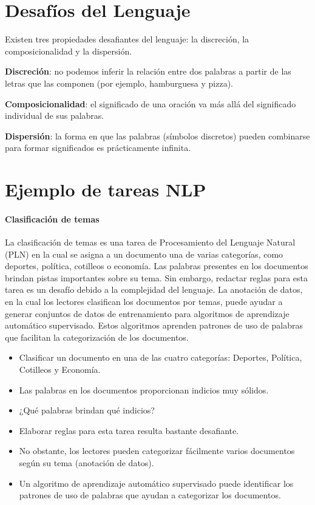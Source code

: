 \documentclass{book}
\begin{document}
\section{Desafíos del Lenguaje}

Existen tres propiedades desafiantes del lenguaje: la discreción, la composicionalidad y la dispersión.

\textbf{Discreción}: no podemos inferir la relación entre dos palabras a partir de las letras que las componen (por ejemplo, hamburguesa y pizza).

\textbf{Composicionalidad}: el significado de una oración va más allá del significado individual de sus palabras.

\textbf{Dispersión}: la forma en que las palabras (símbolos discretos) pueden combinarse para formar significados es prácticamente infinita.



\section{Ejemplo de tareas NLP}


\paragraph{Clasificación de temas}

La clasificación de temas es una tarea de Procesamiento del Lenguaje Natural (PLN) en la cual se asigna a un documento una de varias categorías, como deportes, política, cotilleos o economía. Las palabras presentes en los documentos brindan pistas importantes sobre su tema. Sin embargo, redactar reglas para esta tarea es un desafío debido a la complejidad del lenguaje. La anotación de datos, en la cual los lectores clasifican los documentos por temas, puede ayudar a generar conjuntos de datos de entrenamiento para algoritmos de aprendizaje automático supervisado. Estos algoritmos aprenden patrones de uso de palabras que facilitan la categorización de los documentos.

\begin{itemize}
\item Clasificar un documento en una de las cuatro categorías: Deportes, Política, Cotilleos y Economía.
\item Las palabras en los documentos proporcionan indicios muy sólidos.
\item ¿Qué palabras brindan qué indicios?
\item Elaborar reglas para esta tarea resulta bastante desafiante.
\item No obstante, los lectores pueden categorizar fácilmente varios documentos según su tema (anotación de datos).
\item Un algoritmo de aprendizaje automático supervisado puede identificar los patrones de uso de palabras que ayudan a categorizar los documentos.
\end{itemize}
\end{document}
